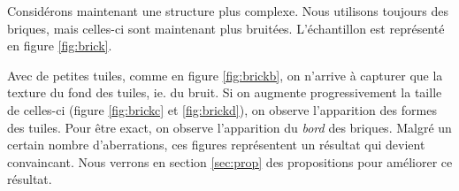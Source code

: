 \documentclass{article}
\begin{document}
Considérons maintenant une structure plus complexe. Nous utilisons toujours des briques, mais celles-ci sont maintenant plus bruitées. L'échantillon est représenté en figure \ref{fig:brick}.

Avec de petites tuiles, comme en figure \ref{fig:brickb}, on n'arrive à capturer que la texture du fond des tuiles, ie. du bruit. Si on augmente progressivement la taille de celles-ci (figure \ref{fig:brickc} et \ref{fig:brickd}), on observe l'apparition des formes des tuiles. Pour être exact, on observe l'apparition du \emph{bord} des briques. 
Malgré un certain nombre d'aberrations, ces figures représentent un résultat qui devient convaincant. Nous verrons en section \ref{sec:prop} des propositions pour améliorer ce résultat.

\end{document}

